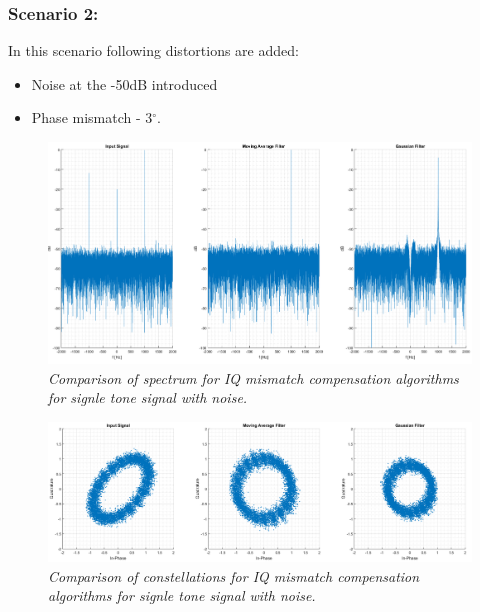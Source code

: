 \documentclass[en,printmode]{mgr}
\begin{document}
		\subsubsection*{Scenario 2:}
			In this scenario following distortions are added:
			\begin{itemize}
				\item Noise at the -50dB introduced
				\item Phase mismatch - 3$^\circ$.
			\end{itemize}
			\begin{figure}[H]
    			\centering
   				\includegraphics[width=\textwidth]{plots/single_nf.png}
   		 		\caption{\textit{Comparison of spectrum for IQ mismatch compensation algorithms 
   		 		for signle tone signal with noise.}}
   		 	\end{figure}	
   		 	\begin{figure}[H]
    			\centering
   				\includegraphics[width=\textwidth]{plots/single_nc.png}
   		 		\caption{\textit{Comparison of constellations for IQ mismatch compensation algorithms 
   		 		for signle tone signal with noise.}}
   		 	\end{figure}
\end{document}
